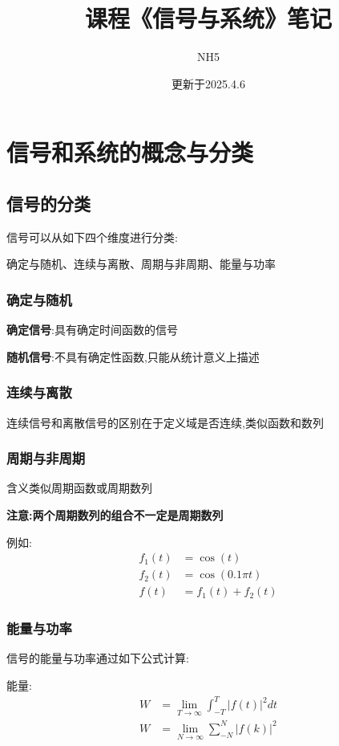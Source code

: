 \documentclass[12pt, a4paper, oneside]{ctexart}
\title{课程《信号与系统》笔记}
\author{NH5}
\date{更新于2025.4.6}
\begin{document}
\maketitle

\section{信号和系统的概念与分类}
\subsection{信号的分类}
信号可以从如下四个维度进行分类:

确定与随机、连续与离散、周期与非周期、能量与功率

\subsubsection{确定与随机}
\textbf{确定信号}:具有确定时间函数的信号

\textbf{随机信号}:不具有确定性函数,只能从统计意义上描述

\subsubsection{连续与离散}
连续信号和离散信号的区别在于定义域是否连续,类似函数和数列

\subsubsection{周期与非周期}
含义类似周期函数或周期数列

\textbf{注意:两个周期数列的组合不一定是周期数列}

例如:
\begin{align*}
    f_1(t) &= \cos (t)\\
    f_2(t) &= \cos (0.1 \pi t)\\
    f(t) &= f_1(t) + f_2(t)
\end{align*}

\subsubsection{能量与功率}
信号的能量与功率通过如下公式计算:

能量:
\begin{align*}
    W &= \lim_{T \to \infty}\int_{-T}^{T} |f(t)|^2 dt\\
    W &= \lim_{N \to \infty}\sum_{-N}^{N}|f(k)|^2
\end{align*}
\end{document}
